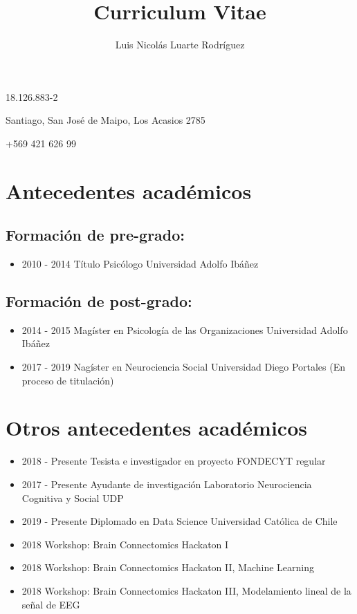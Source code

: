 \documentclass[11pt]{article}
\author{Luis Nicolás Luarte Rodríguez}
\date{}
\title{Curriculum Vitae}
\begin{document}
\maketitle
\vspace{-13mm}
\begin{center}
18.126.883-2

Santiago, San José de Maipo, Los Acasios 2785

+569 421 626 99
\end{center}
\section*{Antecedentes académicos}
\label{sec:orgaf3f8f7}
\subsection*{Formación de pre-grado:}
\label{sec:org77645b4}
\begin{itemize}
\item 2010 - 2014 Título Psicólogo Universidad Adolfo Ibáñez
\end{itemize}
\subsection*{Formación de post-grado:}
\label{sec:org213e74d}
\begin{itemize}
\item 2014 - 2015 Magíster en Psicología de las Organizaciones Universidad Adolfo Ibáñez
\item 2017 - 2019 Nagíster en Neurociencia Social Universidad Diego Portales (En proceso de titulación)
\end{itemize}
\section*{Otros antecedentes académicos}
\label{sec:org9b3569b}
\begin{itemize}
\item 2018 - Presente Tesista e investigador en proyecto FONDECYT regular
\item 2017 - Presente Ayudante de investigación Laboratorio Neurociencia Cognitiva y Social UDP
\item 2019 - Presente Diplomado en Data Science Universidad Católica de Chile
\item 2018 Workshop: Brain Connectomics Hackaton I
\item 2018 Workshop: Brain Connectomics Hackaton II, Machine Learning
\item 2018 Workshop: Brain Connectomics Hackaton III, Modelamiento lineal de la señal de EEG
\end{itemize}
\end{document}

